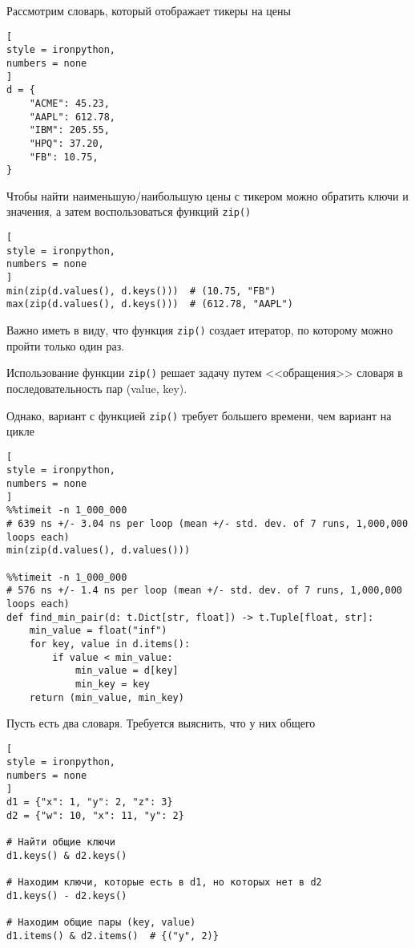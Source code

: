 \documentclass[%
	11pt,
	a4paper,
	utf8,
		]{article}
\begin{document}
Рассмотрим словарь, который отображает тикеры на цены
\begin{lstlisting}[
style = ironpython,
numbers = none
]
d = {
    "ACME": 45.23,
    "AAPL": 612.78,
    "IBM": 205.55,
    "HPQ": 37.20,
    "FB": 10.75,
}
\end{lstlisting}

Чтобы найти наименьшую/наибольшую цены с тикером можно обратить ключи и значения, а затем воспользоваться функций \texttt{zip()}
\begin{lstlisting}[
style = ironpython,
numbers = none
]
min(zip(d.values(), d.keys()))  # (10.75, "FB")
max(zip(d.values(), d.keys()))  # (612.78, "AAPL")
\end{lstlisting}

Важно иметь в виду, что функция \texttt{zip()} создает итератор, по которому можно пройти только один раз.

Использование функции \texttt{zip()} решает задачу путем <<обращения>> словаря в последовательность пар (value, key). 

Однако, вариант с функцией \texttt{zip()} требует большего времени, чем вариант на цикле
\begin{lstlisting}[
style = ironpython,
numbers = none
]
%%timeit -n 1_000_000
# 639 ns +/- 3.04 ns per loop (mean +/- std. dev. of 7 runs, 1,000,000 loops each)
min(zip(d.values(), d.values()))  

%%timeit -n 1_000_000
# 576 ns +/- 1.4 ns per loop (mean +/- std. dev. of 7 runs, 1,000,000 loops each)
def find_min_pair(d: t.Dict[str, float]) -> t.Tuple[float, str]:
    min_value = float("inf")
    for key, value in d.items():
        if value < min_value:
            min_value = d[key]
            min_key = key
    return (min_value, min_key)
\end{lstlisting} 

Пусть есть два словаря. Требуется выяснить, что у них общего
\begin{lstlisting}[
style = ironpython,
numbers = none
]
d1 = {"x": 1, "y": 2, "z": 3}
d2 = {"w": 10, "x": 11, "y": 2}

# Найти общие ключи
d1.keys() & d2.keys()

# Находим ключи, которые есть в d1, но которых нет в d2
d1.keys() - d2.keys()

# Находим общие пары (key, value)
d1.items() & d2.items()  # {("y", 2)}
\end{lstlisting}
\end{document}
